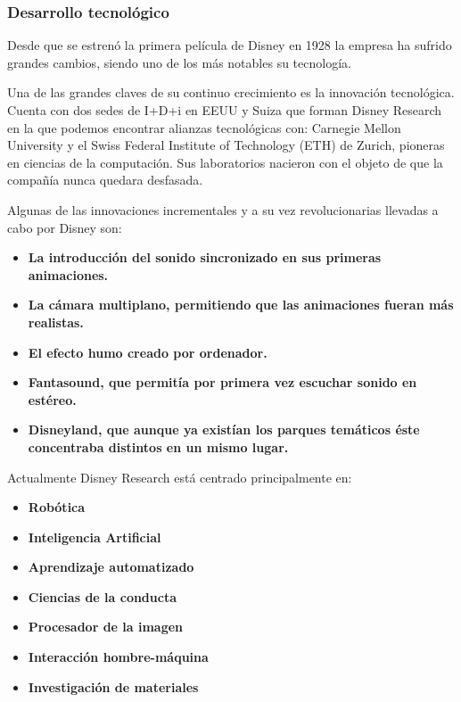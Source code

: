 \subsubsection{Desarrollo tecnológico}

Desde que se estrenó la primera película de Disney en 1928 la empresa ha sufrido
grandes cambios, siendo uno de los más notables su tecnología.

Una de las grandes claves de su continuo crecimiento es la innovación tecnológica. Cuenta con dos sedes de I+D+i en EEUU y Suiza que forman Disney Research en la que podemos encontrar alianzas tecnológicas con: Carnegie Mellon University y el Swiss Federal Institute of Technology (ETH) de Zurich, pioneras en ciencias de la computación. Sus laboratorios nacieron con el objeto de que la compañía nunca quedara desfasada.

Algunas de las innovaciones incrementales y a su vez revolucionarias llevadas a cabo por Disney son:
\begin{itemize}
\item
\textbf{La introducción del sonido sincronizado en sus primeras animaciones.}
\item
\textbf{La cámara multiplano, permitiendo que las animaciones fueran más realistas.}
\item
\textbf{El efecto humo creado por ordenador.}
\item
\textbf{Fantasound, que permitía por primera vez escuchar sonido en estéreo.}
\item
\textbf{Disneyland, que aunque ya existían los parques temáticos éste concentraba distintos en un mismo lugar.}

\end{itemize}
Actualmente Disney Research está centrado principalmente en:
\begin{itemize}

\item
\textbf{Robótica}
\item
\textbf{Inteligencia Artificial}
\item
\textbf{Aprendizaje automatizado}
\item
\textbf{Ciencias de la conducta}
\item
\textbf{Procesador de la imagen}
\item
\textbf{Interacción hombre-máquina}
\item
\textbf{Investigación de materiales}

\end{itemize}

